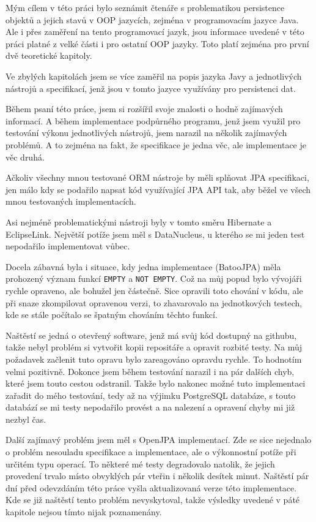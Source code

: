 Mým cílem v této práci bylo seznámit čtenáře s problematikou persistence objektů a jejich stavů v OOP jazycích, zejména v programovacím jazyce Java. Ale i přes zaměření na tento programovací jazyk, jsou informace uvedené v této práci platné z velké části i pro ostatní OOP jazyky. Toto platí zejména pro první dvě teoretické kapitoly.

Ve zbylých kapitolách jsem se více zaměřil na popis jazyka Javy a jednotlivých nástrojů a specifikací, jenž jsou v tomto jazyce využívány pro persistenci dat.

Během psaní této práce, jsem si rozšířil svoje znalosti o hodně zajímavých informací. A během implementace podpůrného programu, jenž jsem využil pro testování výkonu jednotlivých nástrojů, jsem narazil na několik zajímavých problémů. A to zejména na fakt, že specifikace je jedna věc, ale implementace je věc druhá.

Ačkoliv všechny mnou testované ORM nástroje by měli splňovat JPA specifikaci, jen málo kdy se podařilo napsat kód využívající JPA API tak, aby běžel ve všech mnou testovaných implementacích.

Asi nejméně problematickými nástroji byly v tomto směru Hibernate a EclipseLink. Největší potíže jsem měl s DataNucleus, u kterého se mi jeden test nepodařilo implementovat vůbec.

Docela zábavná byla i situace, kdy jedna implementace (BatooJPA) měla prohozený význam funkcí \texttt{EMPTY} a \texttt{NOT EMPTY}. Což na můj popud bylo vývojáři rychle opraveno, ale bohužel jen částečně. Sice opravili toto chování v kódu, ale při snaze zkompilovat opravenou verzi, to zhavarovalo na jednotkových testech, kde se stále počítalo se špatným chováním těchto funkcí.

Naštěstí se jedná o otevřený software, jenž má svůj kód dostupný na githubu, takže nebyl problém si vytvořit kopii repositáře a opravit rozbité testy. Na můj požadavek začlenit tuto opravu bylo zareagováno opravdu rychle. To hodnotím velmi pozitivně. Dokonce jsem během testování narazil i na pár dalších chyb, které jsem touto cestou odstranil. Takže bylo nakonec možné tuto implementaci zařadit do mého testování, tedy až na výjimku PostgreSQL databáze, s touto databází se mi testy nepodařilo provést a na nalezení a opravení chyby mi již nezbyl čas.

Další zajímavý problém jsem měl s OpenJPA implementací. Zde se sice nejednalo o problém nesouladu specifikace a implementace, ale o výkonnostní potíže při určitém typu operací. To některé mé testy degradovalo natolik, že jejich provedení trvalo místo obvyklých pár vteřin i několik desítek minut. Naštěstí pár dní před odevzdáním této práce vyšla aktualizovaná verze této implementace. Kde se již naštěstí tento problém nevyskytoval, takže výsledky uvedené v páté kapitole nejsou tímto nijak poznamenány.

